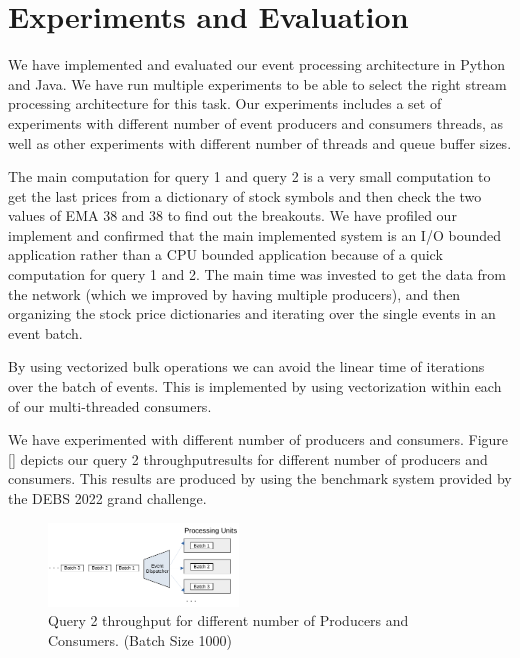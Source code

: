 \section{Experiments and Evaluation}\label{sec:experiments}
We have implemented and evaluated our event processing architecture in Python and Java. We have run multiple experiments  to be 
able to select the right stream processing architecture for this task. Our experiments includes a set of experiments with different 
number of event producers and consumers threads, as well as other experiments with different number of threads and queue buffer sizes. 

The main computation for query 1 and query 2 is a very small computation to get the last prices from a dictionary of stock symbols and then 
check the two values of EMA 38 and 38 to find out the breakouts. We have profiled our implement and confirmed that the main implemented system 
is an I/O bounded application rather than a CPU bounded application because of a quick computation for query 1 and 2. The main time was 
invested to get the data from the network (which we improved by having multiple producers), and then organizing the stock price 
dictionaries and iterating over the single events in an event batch. 

By using vectorized bulk operations we can avoid the linear time of iterations over the batch of events. This is implemented by using 
vectorization within each of our multi-threaded consumers. 

We have experimented with different number of producers and consumers. Figure \ref{} depicts our query 2 throughputresults for different number of 
producers and consumers. This results are produced by using the benchmark system provided by the DEBS 2022 grand challenge. 


\begin{figure}[]
    \begin{center}
        \includegraphics[width=0.45\textwidth]{./images/Stream-Batch-Distributions}
        \caption{Query 2 throughput for different number of Producers and Consumers. (Batch Size 1000)}
        \label{fig:batch-distributions}
    \end{center}
\end{figure}




